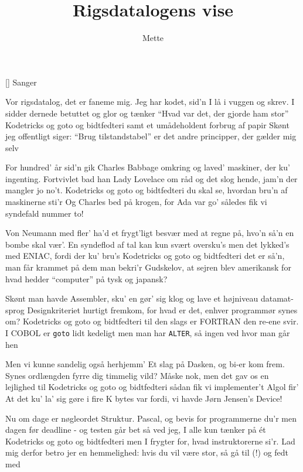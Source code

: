 \documentclass[a4paper,11pt]{article}
\title{Rigsdatalogens vise}
\author{Mette}
\begin{document}
\maketitle

\begin{roles}
[] Sanger
\end{roles}

\begin{song}
  Vor rigsdatalog, det er faneme mig.
  Jeg har kodet, sid'n I lå i vuggen og skrev.
I sidder dernede betuttet og glor
og tænker "`Hvad var det, der gjorde ham stor"'
\hspace{1cm} Kodetricks og goto og bidtfedteri
\hspace{1cm} samt et umådeholdent forbrug af papir
Skønt jeg offentligt siger: "`Brug tilstandstabel"'
er det andre principper, der gælder mig selv

For hundred' år sid'n gik Charles Babbage omkring
og laved' maskiner, der ku' ingenting.
Fortvivlet bad han Lady Lovelace om råd
og det slog hende, jam'n der mangler jo no't.
\hspace{1cm} Kodetricks og goto og bidtfedteri
\hspace{1cm} du skal se, hvordan bru'n af maskinerne sti'r
Og Charles bed på krogen, for Ada var go'
således fik vi syndefald nummer to!

Von Neumann med fler' ha'd et frygt'ligt besvær
med at regne på, hvo'n så'n en bombe skal vær'.
En syndeflod af tal kan kun svært oversku's
men det lykked's med ENIAC, fordi der ku' bru's
\hspace{1cm} Kodetricks og goto og bidtfedteri
\hspace{1cm} det er så'n, man får krammet på dem man bekri'r
Gudskelov, at sejren blev amerikansk
for hvad hedder "`computer"' på tysk og japansk?

Skønt man havde Assembler, sku' en gør' sig klog
og lave et højniveau datamat-sprog
Designkriteriet hurtigt fremkom,
for hvad er det, enhver programmør synes om?
\hspace{1cm} Kodetricks og goto og bidtfedteri
\hspace{1cm} til den slags er FORTRAN den re-ene svir.
I COBOL er {\tt goto} lidt kedeligt men
man har {\tt ALTER}, så ingen ved hvor man går hen

Men vi kunne sandelig også herhjemm'
Et slag på Dasken, og bi-er kom frem.
Synes ordlængden fyrre dig timmelig vild?
Måske nok, men det gav os en lejlighed til
\hspace{1cm} Kodetricks og goto og bidtfedteri
\hspace{1cm} sådan fik vi implementer't Algol fir'
At det ku' la' sig gøre i fire K bytes
var fordi, vi havde Jørn Jensen's Device!

Nu om dage er nøgleordet Struktur.
Pascal, og bevis for programmerne du'r
men dagen før deadline - og testen går bet
så ved jeg, I alle kun tænker på ét
\hspace{1cm} Kodetricks og goto og bidtfedteri
\hspace{1cm} men I frygter for, hvad instruktorerne si'r.
Lad mig derfor betro jer en hemmelighed:
hvis du vil være stor, så gå til (!) og fedt med
\end{song}
\end{document}
